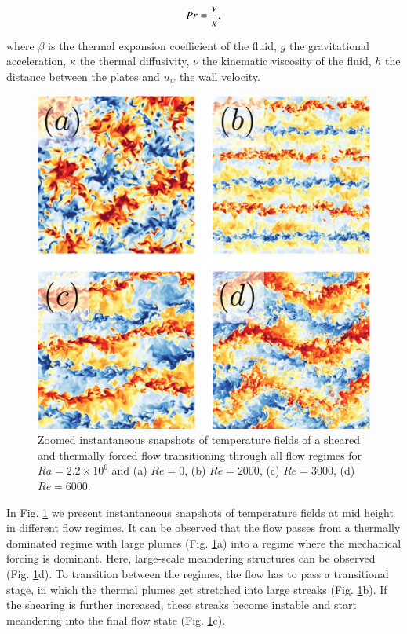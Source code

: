 \documentclass[final,5p,times,twocolumn]{elsarticle}
\begin{document}
\begin{equation} %
Pr= \frac{\nu}{\kappa},
\label{eqn:Pr} \\[8pt]
\end{equation}


where $ \beta $ is the thermal expansion coefficient of the fluid, $ g $ the
gravitational acceleration, $ \kappa $ the thermal diffusivity, $ \nu $ the
kinematic viscosity of the fluid, $ h $ the distance between the plates and
$ u_w $ the wall velocity.

\begin{figure}
	\centering
	\includegraphics[width=\linewidth]{squaredoverview}%
	\caption{\label{fig:overview} Zoomed instantaneous snapshots of temperature fields
of a sheared and thermally forced flow transitioning through all flow regimes
for $ Ra=2.2 \times 10^6 $ and (a) $ Re=0 $, (b) $ Re=2000 $, (c) $ Re=3000 $, (d) $ Re=6000 $.}
\end{figure}

In Fig. \ref{fig:overview} we present instantaneous snapshots of temperature
fields at mid height in different flow regimes. It can be observed that the flow passes from a
thermally dominated regime with large plumes (Fig. \ref{fig:overview}a) into a
regime where the mechanical forcing is dominant. Here, large-scale meandering
structures can be observed (Fig. \ref{fig:overview}d). To transition between the
regimes, the flow has to pass a transitional stage, in which the thermal plumes
get stretched into large streaks (Fig. \ref{fig:overview}b). If the shearing is
further increased, these streaks become instable and start meandering into the
final flow state (Fig. \ref{fig:overview}c).
\end{document}
